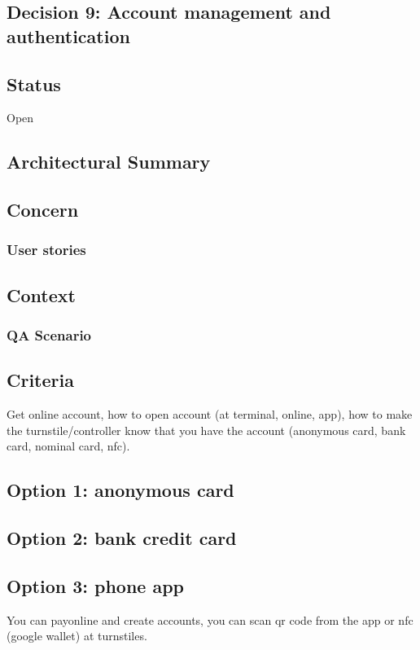 \subsection{Decision 9: Account management and authentication}

\subsection*{Status}
Open
\subsection*{Architectural Summary}


\subsection*{Concern}
\subsubsection*{User stories}

\subsection*{Context}
\subsubsection*{QA Scenario} %
\subsection*{Criteria}

Get online account, how to open account (at terminal, online, app), how to make the turnstile/controller know that you have the account (anonymous card, bank card, nominal card, nfc).

\subsection*{Option 1: anonymous card}
\subsection*{Option 2: bank credit card}
\subsection*{Option 3: phone app}
You can payonline and create accounts, you can scan qr code from the app or nfc (google wallet) at turnstiles.

